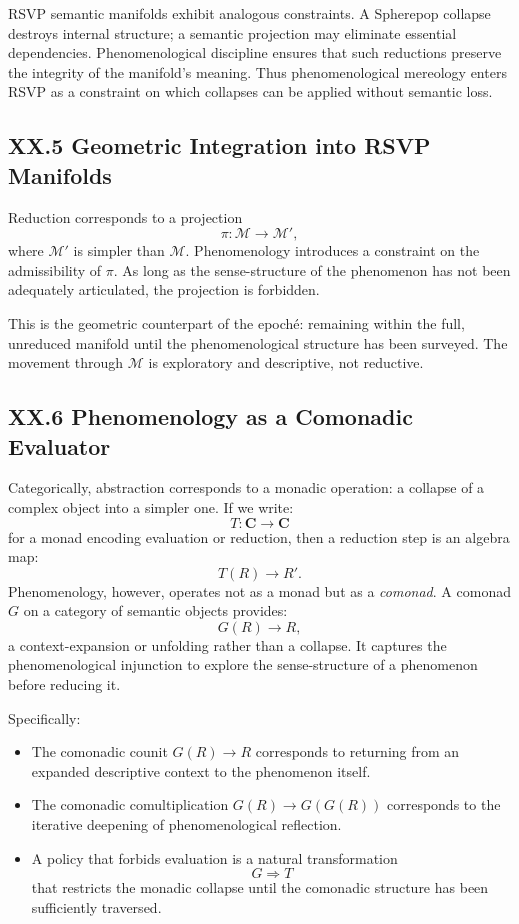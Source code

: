 \documentclass[12pt,letterpaper]{article}
\begin{document}
RSVP semantic manifolds exhibit analogous constraints.  A Spherepop collapse
destroys internal structure; a semantic projection may eliminate essential
dependencies.  Phenomenological discipline ensures that such reductions preserve
the integrity of the manifold’s meaning.  Thus phenomenological mereology enters
RSVP as a constraint on which collapses can be applied without semantic loss.

\subsection{XX.5 Geometric Integration into RSVP Manifolds}

Reduction corresponds to a projection
\[
\pi : \mathcal{M} \to \mathcal{M}',
\]
where $\mathcal{M}'$ is simpler than $\mathcal{M}$.  Phenomenology introduces a
constraint on the admissibility of $\pi$.  As long as the sense-structure of the
phenomenon has not been adequately articulated, the projection is forbidden.

This is the geometric counterpart of the epoché: remaining within the full,
unreduced manifold until the phenomenological structure has been surveyed.  The
movement through $\mathcal{M}$ is exploratory and descriptive, not reductive.

\subsection{XX.6 Phenomenology as a Comonadic Evaluator}

Categorically, abstraction corresponds to a monadic operation: a collapse of a
complex object into a simpler one.  If we write:
\[
T : \mathbf{C} \to \mathbf{C}
\]
for a monad encoding evaluation or reduction, then a reduction step is an
algebra map:
\[
T(R) \to R'.
\]
Phenomenology, however, operates not as a monad but as a \emph{comonad}.  A
comonad $G$ on a category of semantic objects provides:
\[
G(R) \to R,
\]
a context-expansion or unfolding rather than a collapse.  It captures the
phenomenological injunction to explore the sense-structure of a phenomenon
before reducing it.

Specifically:
\begin{itemize}
    \item The comonadic counit $G(R) \to R$ corresponds to returning from an expanded
    descriptive context to the phenomenon itself.
    \item The comonadic comultiplication $G(R) \to G(G(R))$ corresponds to the
    iterative deepening of phenomenological reflection.
    \item A policy that forbids evaluation is a natural transformation
    \[
    G \Rightarrow T
    \]
    that restricts the monadic collapse until the comonadic structure has been
    sufficiently traversed.
\end{itemize}
\end{document}
